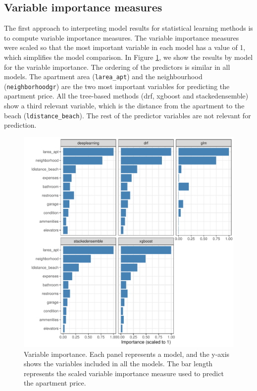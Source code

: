 \documentclass[smallextended,natbib]{svjour3}\usepackage[]{graphicx}\usepackage[]{xcolor}
\begin{document}
\subsection{Variable importance measures}
\label{sec:varimp} 
The first approach to interpreting model results for statistical learning methods is to compute variable importance measures. 
The variable importance measures were scaled so that the most important variable in each model has a value of 1, which simplifies the model comparison.  In Figure \ref{fig-imp}, we show  the results  by model for the variable importance. The ordering of the predictors is similar in all models. The apartment area (\texttt{larea\_apt}) and the neighbourhood (\texttt{neighborhoodgr}) are the two most important variables for predicting the apartment price. All the tree-based methods (drf, xgboost and stackedensemble) show a third relevant variable, which is the distance from the apartment to the beach (\texttt{ldistance\_beach}). The rest of the predictor variables are not relevant for prediction.  

\begin{figure}[htpb]
    \centering
    \includegraphics[scale=.9]{figures/fig-importance.pdf}
    \caption{Variable importance. Each panel represents a model, and the y-axis shows the variables included in all the models. The bar length represents the scaled variable importance measure used to predict the apartment price.}
    \label{fig-imp}
\end{figure}
\end{document}
